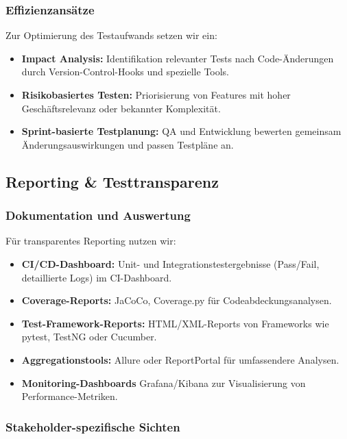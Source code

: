 \subsubsection{Effizienzansätze}
Zur Optimierung des Testaufwands setzen wir ein:

\begin{itemize}
    \item \textbf{Impact Analysis:} Identifikation relevanter Tests nach Code-Änderungen durch
    Version-Control-Hooks und spezielle Tools.
    \item \textbf{Risikobasiertes Testen:} Priorisierung von Features mit hoher Geschäftsrelevanz
    oder bekannter Komplexität.
    \item \textbf{Sprint-basierte Testplanung:} QA und Entwicklung bewerten gemeinsam
    Änderungsauswirkungen und passen Testpläne an.
\end{itemize}

\subsection{Reporting \& Testtransparenz}

\subsubsection{Dokumentation und Auswertung}
Für transparentes Reporting nutzen wir:

\begin{itemize}
    \item \textbf{CI/CD-Dashboard:} Unit- und Integrationstestergebnisse
    (Pass/Fail, detaillierte Logs) im CI-Dashboard.
    \item \textbf{Coverage-Reports:} JaCoCo, Coverage.py für Codeabdeckungsanalysen.
    \item \textbf{Test-Framework-Reports:} HTML/XML-Reports von Frameworks wie pytest, TestNG
    oder Cucumber.
    \item \textbf{Aggregationstools:} Allure oder ReportPortal für umfassendere Analysen.
    \item \textbf{Monitoring-Dashboards} Grafana/Kibana zur Visualisierung von Performance-Metriken.
\end{itemize}

\subsubsection{Stakeholder-spezifische Sichten}

